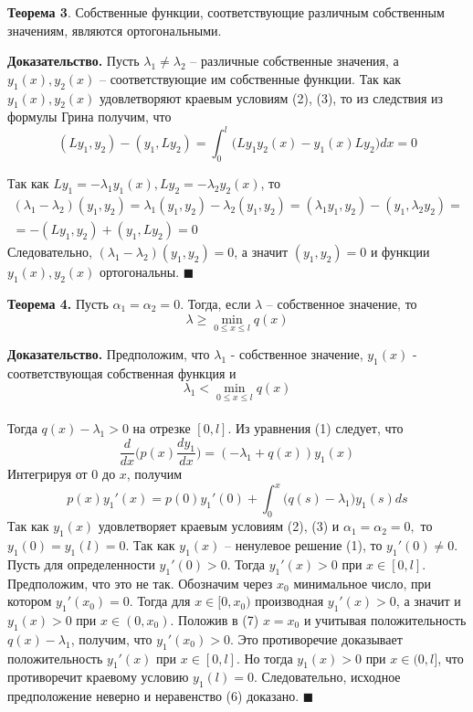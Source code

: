 \textbf{Теорема 3}. Собственные функции, соответствующие различным собственным значениям, являются ортогональными.

\textbf{Доказательство.} Пусть $\lambda_1 \neq \lambda_2$ – различные собственные значения, а $y_1(x), y_2(x)$ – соответствующие им собственные функции. Так как $y_1(x), y_2(x)$ удовлетворяют краевым условиям (2), (3), то из следствия
из формулы Грина получим, что
\begin{equation*}
(Ly_1,y_2)-(y_1,Ly_2)= \int_{0}^{l}\big( Ly_1 y_2(x) - y_1(x) Ly_2 \big) dx = 0
\end{equation*}

Так как $Ly_1 = -\lambda_1y_1(x), Ly_2 = -\lambda_2y_2(x)$, то
\begin{gather*}
(\lambda_1-\lambda_2)(y_1,y_2)=\lambda_1(y_1,y_2)-\lambda_2(y_1,y_2)=(\lambda_1 y_1,y_2)-(y_1,\lambda_2 y_2)=\\
=-(Ly_1,y_2)+(y_1,Ly_2)=0
\end{gather*}
Следовательно, $(\lambda_1 - \lambda_2)(y_1, y_2) = 0$, а значит $(y_1, y_2) = 0$ и функции
$y_1(x), y_2(x)$ ортогональны. $\blacksquare$

\textbf{Теорема 4.} Пусть $\alpha_1 = \alpha_2 = 0$. Тогда, если $\lambda$ – собственное значение, то
\begin{equation*}\tag{6}
    \lambda \geq \min_{0 \leq x \leq l} q(x)
\end{equation*}

\textbf{Доказательство.} Предположим, что $\lambda_1$ - собственное значение, $y_1(x)$
- соответствующая собственная функция и
\begin{equation*}
\lambda_1 < \min_{0 \leq x \leq l} q(x)
\end{equation*}
\\Тогда $q(x)- \lambda_1 > 0$ на отрезке $[0, l]$. Из уравнения (1) следует, что
\begin{equation*}
\frac{d}{d x} \Big( p(x) \frac{d y_1}{d x} \Big) = (-\lambda_1+q(x))y_1(x)
\end{equation*}
Интегрируя от $0$ до $x$, получим
\begin{equation*}\tag{7}
    p(x)y_1'(x) = p(0)y_1'(0) + \int_{0}^{x}\big(q(s)-\lambda_1\big)y_1(s)ds
\end{equation*}
Так как $y_1(x)$ удовлетворяет краевым условиям (2), (3) и $\alpha_1 =
\alpha_2 = 0,$ то $y_1(0) = y_1(l) = 0$. Так как $y_1(x)$ – ненулевое решение (1), то
$y_1'(0) \neq 0$. Пусть для определенности $y_1'(0)>0$. Тогда $y_1'(x)>0$ при
$x \in [0, l]$. Предположим, что это не так. Обозначим через $x_0$ минимальное
число, при котором $y_1'(x_0) = 0$. Тогда для $x \in [0, x_0)$ производная $y_1'(x) >
0$, а значит и $y_1(x) > 0$ при $x \in (0, x_0)$. Положив в (7) $x = x_0$ и
учитывая положительность $q(x) - \lambda_1$, получим, что $y_1'(x_0) > 0$. Это
противоречие доказывает положительность $y_1'(x)$ при $x \in [0, l]$. Но тогда
$y_1(x) > 0$ при $x \in (0, l]$, что противоречит краевому условию $y_1(l) = 0$.
Следовательно, исходное предположение неверно и неравенство (6) доказано. $\blacksquare$

